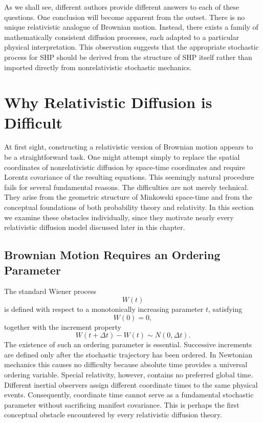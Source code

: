 As we shall see, different authors provide different answers to each of
these questions.
One conclusion will become apparent from the outset. There is no unique
relativistic analogue of Brownian motion. Instead, there exists a family
of mathematically consistent diffusion processes, each adapted to a
particular physical interpretation. This observation suggests that the
appropriate stochastic process for SHP should be derived from the
structure of SHP itself rather than imported directly from
nonrelativistic stochastic mechanics.
\section{Why Relativistic Diffusion is Difficult}
\label{sec:WhyRelativisticDiffusion}
At first sight, constructing a relativistic version of Brownian motion
appears to be a straightforward task. One might attempt simply to
replace the spatial coordinates of nonrelativistic diffusion by
space-time coordinates and require Lorentz covariance of the resulting
equations.
This seemingly natural procedure fails for several fundamental reasons.
The difficulties are not merely technical. They arise from the geometric
structure of Minkowski space-time and from the conceptual foundations of
both probability theory and relativity. In this section we examine these
obstacles individually, since they motivate nearly every relativistic
diffusion model discussed later in this chapter.
\subsection{Brownian Motion Requires an Ordering Parameter}
The standard Wiener process
\[W(t)\]
is defined with respect to a monotonically increasing parameter
\(t\), satisfying
\[W(0)=0,\]
together with the increment property
\[W(t+\Delta t)-W(t)\sim N(0,\Delta t).\]
The existence of such an ordering parameter is essential.
Successive increments are defined only after the stochastic trajectory
has been ordered.
In Newtonian mechanics this causes no difficulty because absolute time
provides a universal ordering variable.
Special relativity, however, contains no preferred global time.
Different inertial observers assign different coordinate times to the
same physical events.
Consequently, coordinate time cannot serve as a fundamental stochastic
parameter without sacrificing manifest covariance.
This is perhaps the first conceptual obstacle encountered by every
relativistic diffusion theory.
